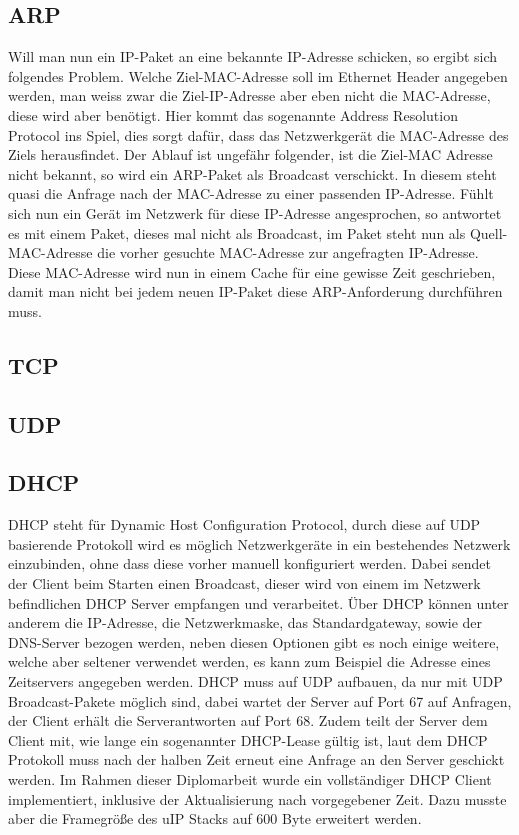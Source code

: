 \documentclass[a4paper,14pt,headsepline]{scrartcl}
\begin{document}
\subsection{ARP}
Will man nun ein IP-Paket an eine bekannte IP-Adresse schicken, so ergibt sich folgendes Problem. Welche Ziel-MAC-Adresse soll im Ethernet Header angegeben werden, man weiss zwar die Ziel-IP-Adresse aber eben nicht die MAC-Adresse, diese wird aber benötigt. Hier kommt das sogenannte Address Resolution Protocol ins Spiel, dies sorgt dafür, dass das Netzwerkgerät die MAC-Adresse des Ziels herausfindet. Der Ablauf ist ungefähr folgender, ist die Ziel-MAC Adresse nicht bekannt, so wird ein ARP-Paket als Broadcast verschickt. In diesem steht quasi die Anfrage nach der MAC-Adresse zu einer passenden IP-Adresse. Fühlt sich nun ein Gerät im Netzwerk für diese IP-Adresse angesprochen, so antwortet es mit einem Paket, dieses mal nicht als Broadcast, im Paket steht nun als Quell-MAC-Adresse die vorher gesuchte MAC-Adresse zur angefragten IP-Adresse. Diese MAC-Adresse wird nun in einem Cache für eine gewisse Zeit geschrieben, damit man nicht bei jedem neuen IP-Paket diese ARP-Anforderung durchführen muss.

\subsection{TCP}

\subsection{UDP}

\subsection{DHCP}
DHCP steht für Dynamic Host Configuration Protocol, durch diese auf UDP basierende Protokoll wird es möglich Netzwerkgeräte in ein bestehendes Netzwerk einzubinden, ohne dass diese vorher manuell konfiguriert werden. Dabei sendet der Client beim Starten einen Broadcast, dieser wird von einem im Netzwerk befindlichen DHCP Server empfangen und verarbeitet. Über DHCP können unter anderem die IP-Adresse, die Netzwerkmaske, das Standardgateway, sowie der DNS-Server bezogen werden, neben diesen Optionen gibt es noch einige weitere, welche aber seltener verwendet werden, es kann zum Beispiel die Adresse eines Zeitservers angegeben werden. DHCP muss auf UDP aufbauen, da nur mit UDP Broadcast-Pakete möglich sind, dabei wartet der Server auf Port 67 auf Anfragen, der Client erhält die Serverantworten auf Port 68. Zudem teilt der Server dem Client mit, wie lange ein sogenannter DHCP-Lease gültig ist, laut dem DHCP Protokoll muss nach der halben Zeit erneut eine Anfrage an den Server geschickt werden. Im Rahmen dieser Diplomarbeit wurde ein vollständiger DHCP Client implementiert, inklusive der Aktualisierung nach vorgegebener Zeit. Dazu musste aber die Framegröße des uIP Stacks auf 600 Byte erweitert werden.
\end{document}
